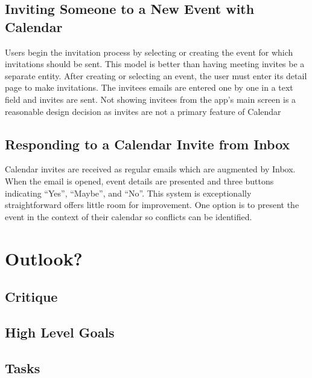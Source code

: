 \documentclass{sigchi}
\begin{document}
\subsection{Inviting Someone to a New Event with Calendar}
Users begin the invitation process by selecting or creating the event for which invitations should be sent.
This model is better than having meeting invites be a separate entity.
After creating or selecting an event, the user must enter its detail page to make invitations.
The invitees emails are entered one by one in a text field and invites are sent.
Not showing invitees from the app's main screen is a reasonable design decision as invites are not a primary feature of Calendar

\subsection{Responding to a Calendar Invite from Inbox}
Calendar invites are received as regular emails which are augmented by Inbox.
When the email is opened, event details are presented and three buttons indicating ``Yes'', ``Maybe'', and ``No''.
This system is exceptionally straightforward offers little room for improvement.
One option is to present the event in the context of their calendar so conflicts can be identified.

\section{Outlook?}

\subsection{Critique}

\subsection{High Level Goals}

\subsection{Tasks}


\balance{}



\end{document}
